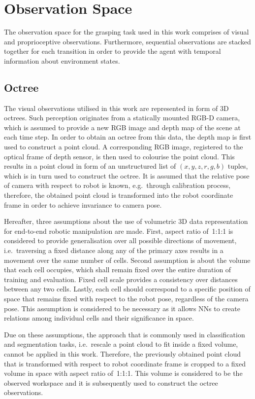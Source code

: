 \section{Observation Space}

The observation space for the grasping task used in this work comprises of visual and proprioceptive observations. Furthermore, sequential observations are stacked together for each transition in order to provide the agent with temporal information about environment states.


\subsection{Octree}

The visual observations utilised in this work are represented in form of 3D octrees. Such perception originates from a statically mounted RGB-D camera, which is assumed to provide a new RGB image and depth map of the scene at each time step. In order to obtain an octree from this data, the depth map is first used to construct a point cloud. A corresponding RGB image, registered to the optical frame of depth sensor, is then used to colourise the point cloud. This results in a point cloud in form of an unstructured list of \((x,y,z,r,g,b)\) tuples, which is in turn used to construct the octree. It is assumed that the relative pose of camera with respect to robot is known, e.g.~through calibration process, therefore, the obtained point cloud is transformed into the robot coordinate frame in order to achieve invariance to camera pose.

Hereafter, three assumptions about the use of volumetric 3D data representation for end-to-end robotic manipulation are made. First, aspect ratio of~1:1:1 is considered to provide generalisation over all possible directions of movement, i.e.~traversing a fixed distance along any of the primary axes results in a movement over the same number of cells. Second assumption is about the volume that each cell occupies, which shall remain fixed over the entire duration of training and evaluation. Fixed cell scale provides a consistency over distances between any two cells. Lastly, each cell should correspond to a specific position of space that remains fixed with respect to the robot pose, regardless of the camera pose. This assumption is considered to be necessary as it allows NNs to create relations among individual cells and their significance in space.


Due on these assumptions, the approach that is commonly used in classification and segmentation tasks, i.e.~rescale a point cloud to fit inside a fixed volume\cite{wang_o-cnn_2017}, cannot be applied in this work. Therefore, the previously obtained point cloud that is transformed with respect to robot coordinate frame is cropped to a fixed volume in space with aspect ratio of~1:1:1. This volume is considered to be the observed workspace and it is subsequently used to construct the octree observations. 




